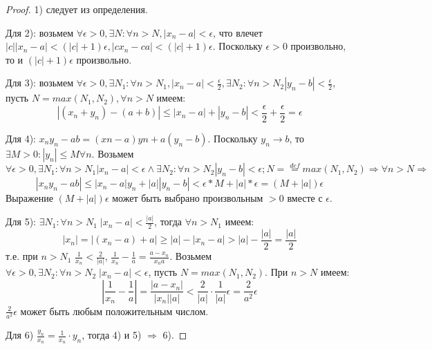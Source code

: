 \documentclass[main]{subfiles}
\begin{document}
\begin{proof}
    1) следует из определения. 
    
    Для 2): возьмем $\forall \epsilon > 0, \exists N
    : \forall n > N, |x_n - a| < \epsilon$, что влечет  $|c||x_n - a| < 
    (|c| + 1)\epsilon, |cx_n - ca| < (|c| + 1)\epsilon$.
    Поскольку $\epsilon > 0$ произвольно, то и $(|c| + 1)\epsilon$ произвольно.

    Для 3): возьмем $\forall \epsilon > 0, \exists N_1 : \forall n > N_1, 
    |x_n - a| < \frac{\epsilon}{2}, \exists N_2 : \forall n > N_2 |y_n - b| < 
    \frac{\epsilon}{2}$, пусть $N = max(N_1, N_2), \forall n > N$ имеем:
    \begin{equation*}
        |(x_n + y_n) - (a + b)| \leq |x_n - a| + |y_n - b| < 
        \frac{\epsilon}{2} + \frac{\epsilon}{2} = \epsilon
    \end{equation*}

    Для 4): $x_ny_n - ab = (xn - a)yn + a(y_n - b)$. Поскольку $y_n \to b$, то
    $\exists M > 0: |y_n| \leq M \forall n$. Возьмем $\forall \epsilon > 0,
    \exists N_1 : \forall n > N_1 |x_n - a| < \epsilon \wedge \exists N_2 :
    \forall n > N_2 |y_n - b| < \epsilon; N = \overset{def}{=} max(N_1, N_2)
    \Rightarrow \forall n > N \Rightarrow$
    \begin{equation*}
        |x_ny_n - ab| \leq |x_n - a|y_n + |a||y_n - b| < \epsilon * M + 
        |a| * \epsilon = (M + |a|)\epsilon
    \end{equation*}
    Выражение $(M + |a|)\epsilon$ может быть выбрано произвольным $> 0$ 
    вместе с $\epsilon$.

    Для 5): $\exists N_1 : \forall n > N_1 \; |x_n - a| < \frac{|a|}{2}$, 
    тогда $\forall n > N_1$ имеем:
    \begin{equation*}
        |x_n| = |(x_n - a) + a| \geq |a| - |x_n - a| > |a| - \frac{|a|}{2} = 
        \frac{|a|}{2}
    \end{equation*}
    т.е. при $n > N_1$ $\frac{1}{x_n} < \frac{2}{|a|}$, $\frac{1}{x_n} - 
    \frac{1}{a} = \frac{a - x_n}{x_na}$. Возьмем $\forall \epsilon > 0, 
    \exists N_2 : \forall n > N_2 \; |x_n - a| < \epsilon$, пусть 
    $N = max(N_1, N_2)$. При $n > N$ имеем:
    \begin{equation*}
        |\frac{1}{x_n} - \frac{1}{a}| = \frac{|a - x_n|}{|x_n||a|} < 
        \frac{2}{|a|} \cdot \frac{1}{|a|}\epsilon = \frac{2}{a^2}\epsilon
    \end{equation*}
    $\frac{2}{a^2}\epsilon$ может быть любым положительным числом.

    Для 6) $\frac{y_n}{x_n} = \frac{1}{x_n} \cdot y_n$, тогда 4) и 5)
    $\Rightarrow$ 6).
\end{proof}
\end{document}
